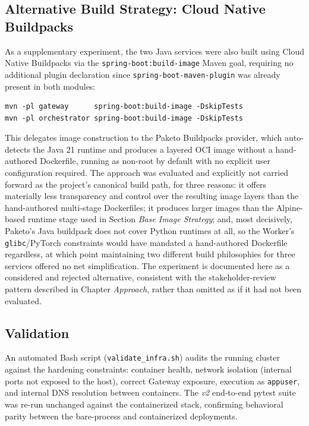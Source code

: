 \documentclass[twoside]{supsistudent}
\begin{document}
\subsection{Alternative Build Strategy: Cloud Native Buildpacks}
As a supplementary experiment, the two Java services were also built using Cloud Native Buildpacks via the \texttt{spring-boot:build-image} Maven goal, requiring no additional plugin declaration since \texttt{spring-boot-maven-plugin} was already present in both modules:

\begin{verbatim}
mvn -pl gateway      spring-boot:build-image -DskipTests
mvn -pl orchestrator spring-boot:build-image -DskipTests
\end{verbatim}

This delegates image construction to the Paketo Buildpacks provider, which auto-detects the Java 21 runtime and produces a layered OCI image without a hand-authored Dockerfile, running as non-root by default with no explicit user configuration required. The approach was evaluated and explicitly not carried forward as the project's canonical build path, for three reasons: it offers materially less transparency and control over the resulting image layers than the hand-authored multi-stage Dockerfiles; it produces larger images than the Alpine-based runtime stage used in Section \emph{Base Image Strategy}; and, most decisively, Paketo's Java buildpack does not cover Python runtimes at all, so the Worker's \texttt{glibc}/PyTorch constraints would have mandated a hand-authored Dockerfile regardless, at which point maintaining two different build philosophies for three services offered no net simplification. The experiment is documented here as a considered and rejected alternative, consistent with the stakeholder-review pattern described in Chapter \emph{Approach}, rather than omitted as if it had not been evaluated.

\subsection{Validation}
An automated Bash script (\texttt{validate\_infra.sh}) audits the running cluster against the hardening constraints: container health, network isolation (internal ports not exposed to the host), correct Gateway exposure, execution as \texttt{appuser}, and internal DNS resolution between containers. The \emph{v2} end-to-end pytest suite was re-run unchanged against the containerized stack, confirming behavioral parity between the bare-process and containerized deployments.
\end{document}
